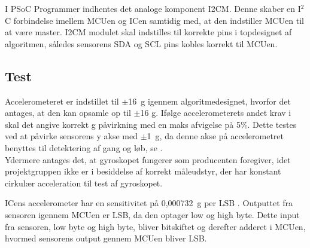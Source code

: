 I PSoC Programmer indhentes det analoge komponent I2CM. Denne skaber en I$^2$C forbindelse imellem MCUen og ICen samtidig med, at den indstiller MCUen til at være master. %
I2CM modulet skal indstilles til korrekte pins i topdesignet af algoritmen, således sensorens SDA og SCL pins kobles korrekt til MCUen.

\subsection{Test}
Accelerometeret er indstillet til $\pm$16~g igennem algoritmedesignet, hvorfor det antages, at den kan opsamle op til $\pm$16 g. Ifølge accelerometerets andet krav i  skal det angive korrekt g påvirkning med en maks afvigelse på 5\%. Dette testes ved at påvirke sensorens y akse med $\pm$1~g, da denne akse på accelerometret benyttes til detektering af gang og løb, se .\\
Ydermere antages det, at gyroskopet fungerer som producenten foregiver, idet projektgruppen ikke er i besiddelse af korrekt måleudstyr, der har konstant cirkulær acceleration til test af gyroskopet.

ICens accelerometer har en sensitivitet på 0,000732~g per LSB \citep{STMicroelectronics2016}. Outputtet fra sensoren igennem MCUen er LSB, da den optager low og high byte. Dette input fra sensoren, low byte og high byte, bliver bitskiftet og derefter adderet i MCUen, hvormed sensorens output gennem MCUen bliver LSB. 

